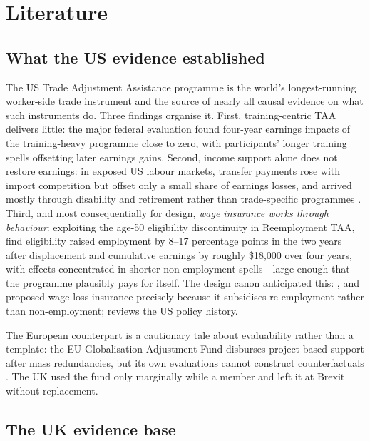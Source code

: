 \section{Literature}\label{sec:literature}

\subsection{What the US evidence established}

The US Trade Adjustment Assistance programme is the world's longest-running
worker-side trade instrument and the source of nearly all causal evidence on
what such instruments do. Three findings organise it. First,
training-centric TAA delivers little: the major federal evaluation
\citep{damicoschochet2012} found four-year earnings impacts of the
training-heavy programme close to zero, with participants' longer training
spells offsetting later earnings gains. Second, income support alone does
not restore earnings: in exposed US labour markets, transfer payments rose
with import competition but offset only a small share of earnings losses,
and arrived mostly through disability and retirement rather than
trade-specific programmes \citep{autor2013, autor2014}. Third, and most
consequentially for design, \emph{wage insurance works through behaviour}:
exploiting the age-50 eligibility discontinuity in Reemployment TAA,
\citet{hyman2024} find eligibility raised employment by 8--17 percentage
points in the two years after displacement and cumulative earnings by
roughly \$18,000 over four years, with effects concentrated in shorter
non-employment spells---large enough that the programme plausibly pays for
itself. The design canon anticipated this: \citet{kling2006},
\citet{lalonde2007} and \citet{kletzerrosen2005} proposed wage-loss
insurance precisely because it subsidises re-employment rather than
non-employment; \citet{wandner2016} reviews the US policy history.

The European counterpart is a cautionary tale about evaluability rather
than a template: the EU Globalisation Adjustment Fund disburses
project-based support after mass redundancies, but its own evaluations
cannot construct counterfactuals \citep{claeyssapir2018}. The UK used the
fund only marginally while a member and left it at Brexit without
replacement.

\subsection{The UK evidence base}

